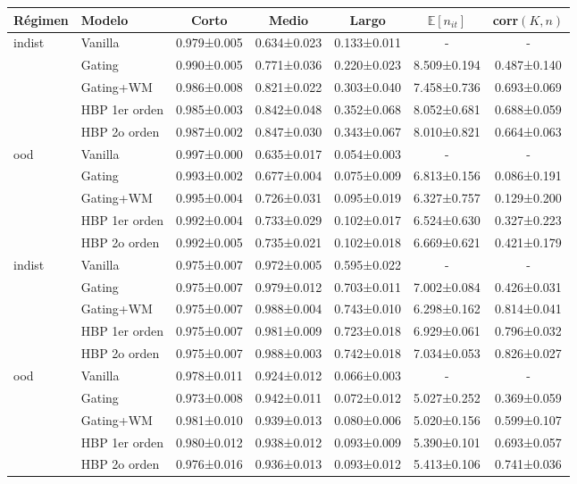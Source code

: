 \begin{tabular}{llccccc}
\toprule
Régimen & Modelo & Corto & Medio & Largo & $\mathbb{E}[n_{it}]$ & corr$(K,n)$ \\
\midrule
indist & Vanilla & 0.979±0.005 & 0.634±0.023 & 0.133±0.011 &    -    &    -    \\
 & Gating & 0.990±0.005 & 0.771±0.036 & 0.220±0.023 & 8.509±0.194 & 0.487±0.140 \\
 & Gating+WM & 0.986±0.008 & 0.821±0.022 & 0.303±0.040 & 7.458±0.736 & 0.693±0.069 \\
 & HBP 1er orden & 0.985±0.003 & 0.842±0.048 & 0.352±0.068 & 8.052±0.681 & 0.688±0.059 \\
 & HBP 2o orden & 0.987±0.002 & 0.847±0.030 & 0.343±0.067 & 8.010±0.821 & 0.664±0.063 \\
\midrule
ood & Vanilla & 0.997±0.000 & 0.635±0.017 & 0.054±0.003 &    -    &    -    \\
 & Gating & 0.993±0.002 & 0.677±0.004 & 0.075±0.009 & 6.813±0.156 & 0.086±0.191 \\
 & Gating+WM & 0.995±0.004 & 0.726±0.031 & 0.095±0.019 & 6.327±0.757 & 0.129±0.200 \\
 & HBP 1er orden & 0.992±0.004 & 0.733±0.029 & 0.102±0.017 & 6.524±0.630 & 0.327±0.223 \\
 & HBP 2o orden & 0.992±0.005 & 0.735±0.021 & 0.102±0.018 & 6.669±0.621 & 0.421±0.179 \\
\midrule
indist & Vanilla & 0.975±0.007 & 0.972±0.005 & 0.595±0.022 &    -    &    -    \\
 & Gating & 0.975±0.007 & 0.979±0.012 & 0.703±0.011 & 7.002±0.084 & 0.426±0.031 \\
 & Gating+WM & 0.975±0.007 & 0.988±0.004 & 0.743±0.010 & 6.298±0.162 & 0.814±0.041 \\
 & HBP 1er orden & 0.975±0.007 & 0.981±0.009 & 0.723±0.018 & 6.929±0.061 & 0.796±0.032 \\
 & HBP 2o orden & 0.975±0.007 & 0.988±0.003 & 0.742±0.018 & 7.034±0.053 & 0.826±0.027 \\
\midrule
ood & Vanilla & 0.978±0.011 & 0.924±0.012 & 0.066±0.003 &    -    &    -    \\
 & Gating & 0.973±0.008 & 0.942±0.011 & 0.072±0.012 & 5.027±0.252 & 0.369±0.059 \\
 & Gating+WM & 0.981±0.010 & 0.939±0.013 & 0.080±0.006 & 5.020±0.156 & 0.599±0.107 \\
 & HBP 1er orden & 0.980±0.012 & 0.938±0.012 & 0.093±0.009 & 5.390±0.101 & 0.693±0.057 \\
 & HBP 2o orden & 0.976±0.016 & 0.936±0.013 & 0.093±0.012 & 5.413±0.106 & 0.741±0.036 \\
\midrule
\bottomrule
\end{tabular}